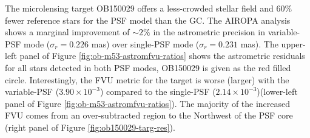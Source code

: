 \documentclass[]{spie}  %
\begin{document}
\indent The microlensing target OB150029 offers a less-crowded stellar field and 60\% fewer reference stars for the PSF model than the GC. The AIROPA analysis shows a marginal improvement of ${\sim}2\%$ in the astrometric precision in variable-PSF mode ($\sigma_{r}=0.226$ mas) over single-PSF mode ($\sigma_{r}=0.231$ mas). The upper-left panel of Figure \ref{fig:ob-m53-astromfvu-ratios} shows the astrometric residuals for all stars detected in both PSF modes, OB150029 is given as the red filled circle. Interestingly, the FVU metric for the target is worse (larger) with the variable-PSF ($3.90\times10^{-3}$) compared to the single-PSF ($2.14\times10^{-3}$)(lower-left panel of Figure \ref{fig:ob-m53-astromfvu-ratios}).
The majority of the increased FVU comes from an over-subtracted region to the Northwest of the PSF core (right panel of Figure \ref{fig:ob150029-targ-res}).
\end{document}
